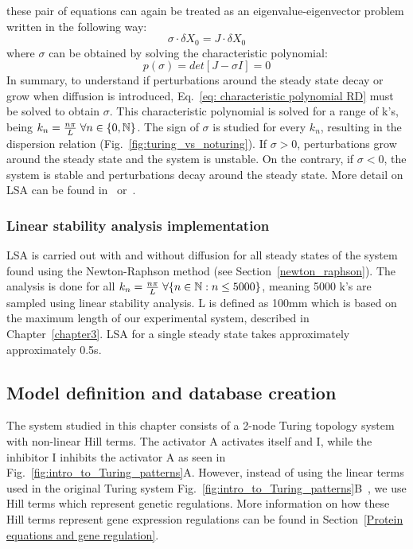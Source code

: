 these pair of equations can again be treated as an eigenvalue-eigenvector problem written in the following way:
\begin{equation}
    \sigma \cdot\delta X_{0} = J \cdot\delta X_{0}
    \label{eq: jacobian RD}
\end{equation}
where $\sigma$ can be obtained by solving the characteristic polynomial:
\begin{equation}
    p(\sigma) = det[J-\sigma I] = 0
    \label{eq: characteristic polynomial RD}
\end{equation}
In summary, to understand if perturbations around the steady state decay or grow when diffusion is introduced, Eq.~\ref{eq: characteristic polynomial RD} must be solved to obtain $\sigma$.
This characteristic polynomial is solved for a range of k's, being $k_{n}=\frac{n\pi}{L} \hspace{0.1cm}\forall n \in \{0, \mathbb{N}\} $.
The sign of $\sigma$ is studied for every $k_{n}$, resulting in the dispersion relation (Fig.~\ref{fig:turing_vs_noturing}).
If $\sigma > 0$, perturbations grow around the steady state and the system is unstable.
On the contrary, if  $\sigma < 0$, the system is stable and perturbations decay around the steady state.
More detail on LSA can be found in~\cite{J.DMurray2002} or~\cite{Glendinning1994}.

\subsubsection{Linear stability analysis implementation}
LSA is carried out with and without diffusion for all steady states of the system found using the Newton-Raphson method (see Section~\ref{newton_raphson}).
The analysis is done for all $k_{n}=\frac{n\pi}{L} \hspace{0.1cm}\forall \{n \in \mathbb{N} : n \leq 5000\} $, meaning 5000 k's are sampled using linear stability analysis.
L is defined as 100mm which is based on the maximum length of our experimental system, described in Chapter~\ref{chapter3}.
LSA for a single steady state takes approximately approximately 0.5s.

\subsection{Model definition and database creation}
The system studied in this chapter consists of a 2-node Turing topology system with non-linear Hill terms.
The activator A activates itself and I, while the inhibitor I inhibits the activator A as seen in Fig.~\ref{fig:intro_to_Turing_patterns}A.
However, instead of using the linear terms used in the original Turing system Fig.~\ref{fig:intro_to_Turing_patterns}B~\parencite{Turing1952}, we use Hill terms which represent genetic regulations.
More information on how these Hill terms represent gene expression regulations can be found in Section~\ref{Protein equations and gene regulation}.

